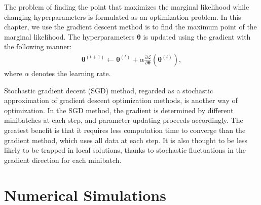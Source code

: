 The problem of finding the point that maximizes the marginal likelihood while changing hyperparameters is formulated as an optimization problem.
In this chapter, we use the gradient descent method is to find the maximum point of the marginal likelihood.
The hyperparameters $\bm{\theta}$ is updated using the gradient with the following manner:
\begin{align}
    \bm{\theta}^{(t+1)} \leftarrow \bm{\theta}^{(t)} + \alpha\frac{\partial\mathcal{L}}{\partial\bm{\theta}}(\bm{\theta}^{(t)}),
\end{align}
where $\alpha$ denotes the learning rate.

Stochastic gradient decent (SGD) method, regarded as a stochastic approximation of gradient descent optimization methods, is another way of optimization.
In the SGD method, the gradient is determined by different minibatches at each step, and parameter updating proceeds accordingly.
The greatest benefit is that it requires less computation time to converge than the gradient method, which uses all data at each step.
It is also thought to be less likely to be trapped in local solutions, thanks to stochastic fluctuations in the gradient direction for each minibatch.

\section{Numerical Simulations}
\label{sec:numerical}







